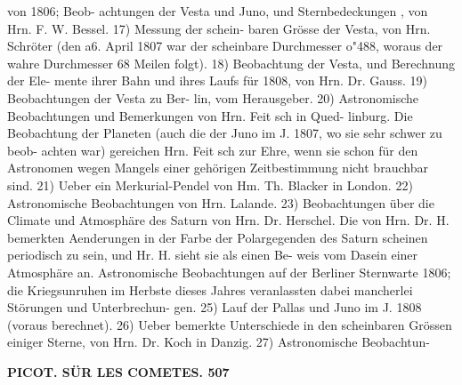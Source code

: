 \documentclass[12pt,a4paper]{article}
\begin{document}
von  1806;  Beob- achtungen der  Vesta  und  Juno,  und  Sternbedeckungen ,  von  Hrn.  F.  W.  Bessel.     17)  Messung  der  schein- baren Grösse  der  Vesta,  von  Hrn.  Schröter  (den  a6.  April  1807  war   der   scheinbare  Durchmesser  o"488, woraus  der  wahre  Durchmesser  68  Meilen  folgt).     18)  Beobachtung  der  Vesta,  und  Berechnung  der  Ele- mente ihrer  Bahn  und  ihres  Laufs  für  1808,  von  Hrn.  Dr.  Gauss.     19)  Beobachtungen  der  Vesta  zu  Ber- lin, vom  Herausgeber.     20)  Astronomische  Beobachtungen  und  Bemerkungen  von  Hrn.  Feit sch  in  Qued- linburg.    Die  Beobachtung  der  Planeten  (auch  die  der  Juno  im  J.  1807,   wo   sie   sehr  schwer   zu  beob- achten war)  gereichen  Hrn.  Feit  sch  zur  Ehre,  wenn  sie  schon  für  den  Astronomen  wegen  Mangels  einer gehörigen  Zeitbestimmung  nicht  brauchbar  sind.     21)  Ueber  ein  Merkurial-Pendel  von  Hm.  Th.  Blacker in  London.     22)  Astronomische  Beobachtungen  von  Hrn.  Lalande.     23)  Beobachtungen  über  die  Climate und  Atmosphäre  des  Saturn  von  Hrn.  Dr.  Herschel.     Die   von  Hrn.  Dr.  H.   bemerkten  Aenderungen  in der  Farbe  der  Polargegenden  des  Saturn  scheinen  periodisch  zu  sein,  und  Hr.  H.  sieht  sie  als  einen  Be- weis vom  Dasein  einer  Atmosphäre  an.     Astronomische  Beobachtungen  auf  der  Berliner  Sternwarte  1806; die  Kriegsunruhen  im  Herbste  dieses  Jahres  veranlassten  dabei  mancherlei  Störungen  und  Unterbrechun- gen.    25)  Lauf  der  Pallas  und  Juno  im  J.  1808  (voraus  berechnet).     26)  Ueber  bemerkte  Unterschiede  in den  scheinbaren  Grössen  einiger  Sterne,  von  Hrn.  Dr.  Koch  in  Danzig.     27)  Astronomische  Beobachtun-

\vspace{0.5em}


\noindent\textbf{PICOT.      SÜR  LES  COMETES.  507}
\end{document}
